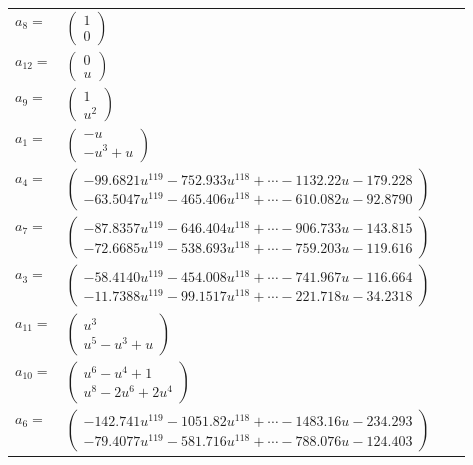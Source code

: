 \documentclass[1p]{elsarticle_modified}
\theoremstyle{definition}
\begin{document}
\begin{tabular}{m{7pt} m{180pt} m{7pt} m{180pt} }
\flushright $a_{8}=$&$\begin{pmatrix}1\\0\end{pmatrix}$ \\
\flushright $a_{12}=$&$\begin{pmatrix}0\\u\end{pmatrix}$ \\
\flushright $a_{9}=$&$\begin{pmatrix}1\\u^2\end{pmatrix}$ \\
\flushright $a_{1}=$&$\begin{pmatrix}- u\\- u^3+u\end{pmatrix}$ \\
\flushright $a_{4}=$&$\begin{pmatrix}-99.6821 u^{119}-752.933 u^{118}+\cdots-1132.22 u-179.228\\-63.5047 u^{119}-465.406 u^{118}+\cdots-610.082 u-92.8790\end{pmatrix}$ \\
\flushright $a_{7}=$&$\begin{pmatrix}-87.8357 u^{119}-646.404 u^{118}+\cdots-906.733 u-143.815\\-72.6685 u^{119}-538.693 u^{118}+\cdots-759.203 u-119.616\end{pmatrix}$ \\
\flushright $a_{3}=$&$\begin{pmatrix}-58.4140 u^{119}-454.008 u^{118}+\cdots-741.967 u-116.664\\-11.7388 u^{119}-99.1517 u^{118}+\cdots-221.718 u-34.2318\end{pmatrix}$ \\
\flushright $a_{11}=$&$\begin{pmatrix}u^3\\u^5- u^3+u\end{pmatrix}$ \\
\flushright $a_{10}=$&$\begin{pmatrix}u^6- u^4+1\\u^8-2 u^6+2 u^4\end{pmatrix}$ \\
\flushright $a_{6}=$&$\begin{pmatrix}-142.741 u^{119}-1051.82 u^{118}+\cdots-1483.16 u-234.293\\-79.4077 u^{119}-581.716 u^{118}+\cdots-788.076 u-124.403\end{pmatrix}$ \\

\end{tabular}
\end{document}
